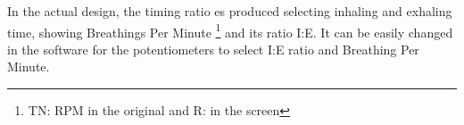     In the actual design, the timing ratio es produced selecting inhaling and exhaling time, showing Breathings Per Minute \footnote{TN: RPM in the original and R: in the screen} and its ratio I:E. It can be easily changed in the software for the potentiometers to select I:E ratio and Breathing Per Minute.
